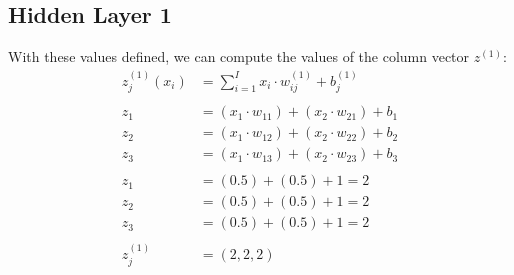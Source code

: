 \documentclass{article}
\begin{document}
\subsection{Hidden Layer 1}
With these values defined, we can compute the values of the column vector $z^{(1)}$:
\begin{align*}
    z^{(1)}_j(x_i) &= \sum^I_{i=1} x_i\cdot w^{(1)}_{ij} + b^{(1)}_j\\ \\
    z_1 &= (x_1\cdot w_{11}) + (x_2\cdot w_{21}) + b_1 \\
    z_2 &= (x_1\cdot w_{12}) + (x_2\cdot w_{22}) + b_2\\
    z_3 &= (x_1\cdot w_{13}) + (x_2\cdot w_{23}) + b_3\\ \\
    z_1 &= (0.5) + (0.5) + 1 = 2\\ 
    z_2 &= (0.5) + (0.5) + 1 = 2\\ 
    z_3 &= (0.5) + (0.5) + 1 = 2\\  \\
    z^{(1)}_j &= (2, 2, 2)  
\end{align*}
\end{document}
